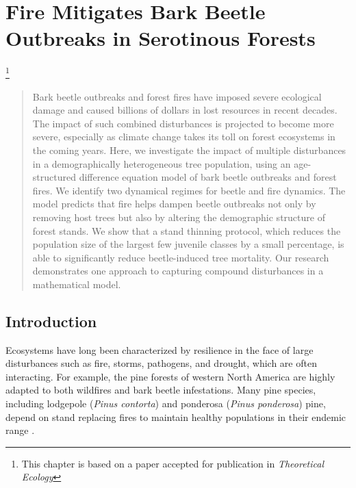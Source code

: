 \chapter{Fire Mitigates Bark Beetle Outbreaks in Serotinous Forests }
\label{mpbmodel}
\let\thefootnote\relax\footnote{This chapter is based on a paper accepted for publication in \textit{Theoretical Ecology}}
\begin{abstract}
Bark beetle outbreaks and forest fires have imposed severe ecological damage and caused billions of dollars in lost resources in recent decades. The impact of such combined disturbances is projected to become more severe, especially as climate change takes its toll on forest ecosystems in the coming years. Here, we investigate the impact of multiple disturbances in a demographically heterogeneous tree population, using an age-structured difference equation model of bark beetle outbreaks and forest fires. We identify two dynamical regimes for beetle and fire dynamics. The model predicts that fire helps dampen beetle outbreaks not only by removing host trees but also by altering the demographic structure of forest stands. We show that a stand thinning protocol, which reduces the population size of the largest few juvenile classes by a small percentage, is able to significantly reduce beetle-induced tree mortality.  Our research demonstrates one approach to capturing compound disturbances in a mathematical model.
\end{abstract}

\section{Introduction}

Ecosystems have long been characterized by resilience in the face of large disturbances such as fire, storms, pathogens, and drought, which are often interacting. For example, the pine forests of western North America are highly adapted to both wildfires and bark beetle infestations. Many pine species, including lodgepole (\textit{Pinus contorta}) and ponderosa (\textit{Pinus ponderosa}) pine, depend on stand replacing fires to maintain healthy populations in their endemic range \cite{bentz2010climate}. 

